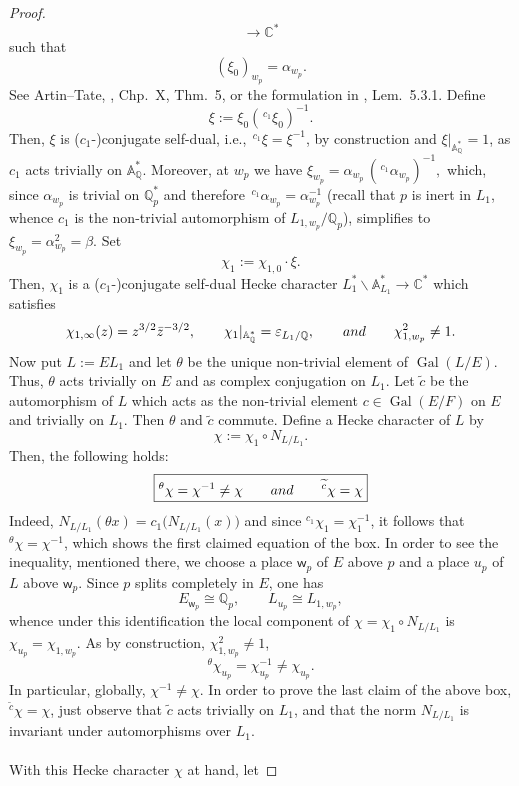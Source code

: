 \documentclass[10pt,a4paper]{amsart}
\def\A{\mathbb A}
\def\C{\mathbb C}
\def\Q{\mathbb Q}
\def\ww{\mathsf w}
\begin{document}
\begin{proof}
$$        \longrightarrow \mathbb C^*
$$
such that
$$
        (\xi_0)_{w_p}=\alpha_{w_p} .
$$
See Artin--Tate, \cite{ArtinTate}, Chp.~X, Thm.~5, or the formulation in \cite{BCGNT}, Lem.\ 5.3.1.  Define
$$
        \xi:=\xi_0({}^{\,c_1}\xi_0)^{-1}.
$$
Then, $\xi$ is ($c_1$-)conjugate self-dual, i.e., ${}^{\,c_1}\xi=\xi^{-1}$, by construction and $\xi|_{\mathbb A_\mathbb Q^*}=1$, as \(c_1\) acts trivially on \(\mathbb A_\mathbb Q^*\). Moreover, at \(w_p\) we have $\xi_{w_p}=\alpha_{w_p}\,({}^{\,c_1}\alpha_{w_p})^{-1},$
which, since \(\alpha_{w_p}\) is trivial on \(\mathbb Q_p^*\) and therefore ${}^{\,c_1}\alpha_{w_p}=\alpha_{w_p}^{-1}$ (recall that $p$ is inert in $L_1$, whence $c_1$ is the non-trivial automorphism of $L_{1,w_p}/\Q_p$), simplifies to $\xi_{w_p} = \alpha_{w_p}^2 = \beta.$ Set
$$
        \chi_1:=\chi_{1,0}\cdot \xi.
$$
Then, $\chi_1$ is a ($c_1$-)conjugate self-dual Hecke character $L^*_1\backslash \A^*_{L_1}\rightarrow\C^*$ which satisfies
$$
        \chi_{1,\infty}(z)
        =
        z^{3/2}\bar z^{-3/2}, \quad\quad
        \chi_1|_{\mathbb A_\mathbb Q^*}
        =
        \varepsilon_{L_1/\mathbb Q},\quad\quad {\rm and} \quad\quad
        \chi_{1,w_p}^2\neq 1.
$$
Now put $L:=EL_1$ and let $\theta$ be the unique non-trivial element of \(\operatorname{Gal}(L/E)\). Thus, \(\theta\) acts trivially on \(E\) and as complex conjugation on \(L_1\). Let \(\widetilde c\) be the automorphism of \(L\) which acts as the non-trivial element \(c\in\operatorname{Gal}(E/F)\) on \(E\) and trivially on \(L_1\). Then \(\theta\) and \(\widetilde c\) commute. Define a Hecke character of \(L\) by
$$
        \chi:=\chi_1\circ N_{L/L_1}.
$$
Then, the following holds:
$$\boxed{{}^{\theta}\chi=\chi^{-1}\neq\chi \quad\quad {\rm and} \quad\quad {}^{\widetilde c}\chi=\chi}$$ 
Indeed, $N_{L/L_1}(\theta x)
        =
        c_1\bigl(N_{L/L_1}(x)\bigr)$ and since \({}^{c_1}\chi_1=\chi_1^{-1}\), it follows that ${}^\theta\chi=\chi^{-1}$, which shows the first claimed equation of the box. In order to see the inequality, mentioned there, we choose a place \(\ww_p\) of \(E\) above \(p\) and
a place \(u_p\) of \(L\) above \(\ww_p\). Since \(p\) splits completely in \(E\), one has
$$
        E_{\ww_p}\cong \mathbb Q_p,
        \qquad
        L_{u_p} \cong L_{1,w_p},
$$
whence under this identification the local component of
\(\chi=\chi_1\circ N_{L/L_1}\) is $\chi_{u_p}=\chi_{1,w_p}.$ As by construction, $\chi_{1,w_p}^2\neq 1$, 
$$
        {}^\theta\chi_{u_p}=\chi_{u_p}^{-1}\neq \chi_{u_p}.
$$
In particular, globally, $\chi^{-1}\neq \chi$. In order to prove the last claim of the above box, ${}^{\widetilde c}\chi=\chi$, just observe that \(\widetilde c\) acts trivially on \(L_1\), and that the norm \(N_{L/L_1}\) is invariant under automorphisms over \(L_1\).\\\\ With this Hecke character $\chi$ at hand, let

\end{proof}
\end{document}
